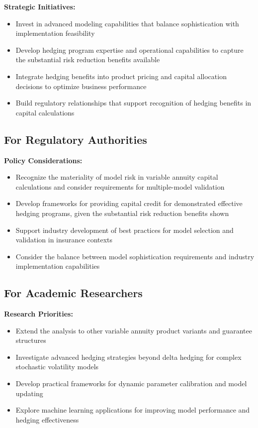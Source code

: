 \documentclass[12pt,a4paper]{report}
\begin{document}
\textbf{Strategic Initiatives:}
\begin{itemize}
\item Invest in advanced modeling capabilities that balance sophistication with implementation feasibility
\item Develop hedging program expertise and operational capabilities to capture the substantial risk reduction benefits available
\item Integrate hedging benefits into product pricing and capital allocation decisions to optimize business performance
\item Build regulatory relationships that support recognition of hedging benefits in capital calculations
\end{itemize}

\subsection{For Regulatory Authorities}

\textbf{Policy Considerations:}
\begin{itemize}
\item Recognize the materiality of model risk in variable annuity capital calculations and consider requirements for multiple-model validation
\item Develop frameworks for providing capital credit for demonstrated effective hedging programs, given the substantial risk reduction benefits shown
\item Support industry development of best practices for model selection and validation in insurance contexts  
\item Consider the balance between model sophistication requirements and industry implementation capabilities
\end{itemize}

\subsection{For Academic Researchers}

\textbf{Research Priorities:}
\begin{itemize}
\item Extend the analysis to other variable annuity product variants and guarantee structures
\item Investigate advanced hedging strategies beyond delta hedging for complex stochastic volatility models
\item Develop practical frameworks for dynamic parameter calibration and model updating
\item Explore machine learning applications for improving model performance and hedging effectiveness
\end{itemize}
\end{document}
